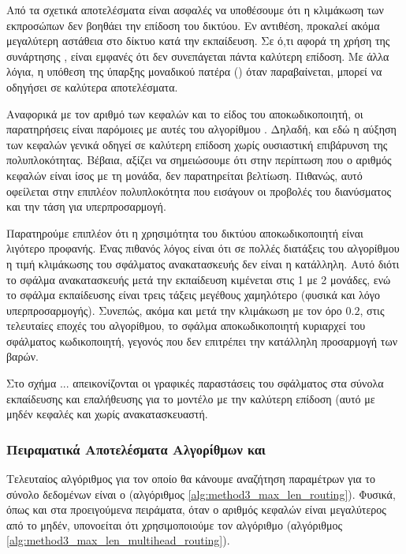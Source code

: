 Από τα σχετικά αποτελέσματα είναι ασφαλές να υποθέσουμε ότι η κλιμάκωση των εκπροσώπων δεν βοηθάει την επίδοση του δικτύου. Εν αντιθέση, προκαλεί ακόμα μεγαλύτερη αστάθεια στο δίκτυο κατά την εκπαίδευση. Σε ό,τι αφορά τη χρήση της συνάρτησης , είναι εμφανές ότι δεν συνεπάγεται πάντα καλύτερη επίδοση. Με άλλα λόγια, η υπόθεση της ύπαρξης μοναδικού πατέρα () όταν παραβαίνεται, μπορεί να οδηγήσει σε καλύτερα αποτελέσματα.\par

Αναφορικά με τον αριθμό των κεφαλών και το είδος του αποκωδικοποιητή, οι παρατηρήσεις είναι παρόμοιες με αυτές του αλγορίθμου . Δηλαδή, και εδώ η αύξηση των κεφαλών γενικά οδηγεί σε καλύτερη επίδοση χωρίς ουσιαστική επιβάρυνση της πολυπλοκότητας. Βέβαια, αξίζει να σημειώσουμε ότι στην περίπτωση που ο αριθμός κεφαλών είναι ίσος με τη μονάδα, δεν παρατηρείται βελτίωση. Πιθανώς, αυτό οφείλεται στην επιπλέον πολυπλοκότητα που εισάγουν οι προβολές του διανύσματος και την τάση για υπερπροσαρμογή.\par 

Παρατηρούμε επιπλέον ότι η χρησιμότητα του δικτύου αποκωδικοποιητή είναι λιγότερο προφανής. Ένας πιθανός λόγος είναι ότι σε πολλές διατάξεις του αλγορίθμου η τιμή κλιμάκωσης του σφάλματος ανακατασκευής δεν είναι η κατάλληλη. Αυτό διότι το σφάλμα ανακατασκευής μετά την εκπαίδευση κιμένεται στις 1 με 2 μονάδες, ενώ το σφάλμα εκπαίδευσης είναι τρεις τάξεις μεγέθους χαμηλότερο (φυσικά και λόγο υπερπροσαρμογής). Συνεπώς, ακόμα και μετά την κλιμάκωση με τον όρο $0.2$, στις τελευταίες εποχές του αλγορίθμου, το σφάλμα αποκωδικοποιητή κυριαρχεί του σφάλματος κωδικοποιητή, γεγονός που δεν επιτρέπει την κατάλληλη προσαρμογή των βαρών.\par

Στο σχήμα ... απεικονίζονται οι γραφικές παραστάσεις του σφάλματος στα σύνολα εκπαίδευσης και επαλήθευσης για το μοντέλο με την καλύτερη επίδοση (αυτό με μηδέν κεφαλές και χωρίς ανακατασκευαστή. 

\subsubsection{Πειραματικά Αποτελέσματα Αλγορίθμων  και }
Τελευταίος αλγόριθμος για τον οποίο θα κάνουμε αναζήτηση παραμέτρων για το σύνολο δεδομένων  είναι ο  (αλγόριθμος \ref{alg:method3_max_len_routing}). Φυσικά, όπως και στα προειγούμενα πειράματα, όταν ο αριθμός κεφαλών είναι μεγαλύτερος από το μηδέν, υπονοείται ότι χρησιμοποιούμε τον αλγόριθμο  (αλγόριθμος \ref{alg:method3_max_len_multihead_routing}).\par

